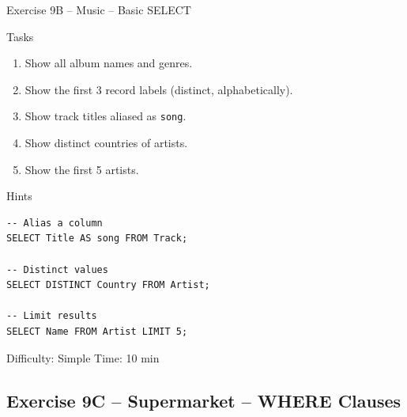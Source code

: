 \documentclass[10pt]{beamer}
\begin{document}
\begin{frame}[fragile]{Exercise 9B -- Music -- Basic SELECT}
  \begin{block}{Tasks}
    \begin{enumerate}
      \item Show all album names and genres.
      \item Show the first 3 record labels (distinct, alphabetically).
      \item Show track titles aliased as \texttt{song}.
      \item Show distinct countries of artists.
      \item Show the first 5 artists.
    \end{enumerate}
  \end{block}

  \begin{block}{Hints}
\begin{lstlisting}[style=sqlstyle]
-- Alias a column
SELECT Title AS song FROM Track;

-- Distinct values
SELECT DISTINCT Country FROM Artist;

-- Limit results
SELECT Name FROM Artist LIMIT 5;
\end{lstlisting}
  \end{block}

  \begin{alertblock}{Difficulty: Simple \quad Time: 10 min}
  \end{alertblock}
\end{frame}

\subsection{Exercise 9C -- Supermarket -- WHERE Clauses}
\end{document}
